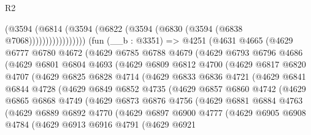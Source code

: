 \begin{lexlean}{R2}
\begin{coremodule}
                      (@3594 (@6814 (@3594 (@6822 (@3594 (@6830 (@3594 (@6838 @7068)))))))))))))))))
    (fun (__b : @3351) =>
    @4251
      (@4631
        @4665
        (@4629
          @6777
          @6780
          @4672
          (@4629
            @6785
            @6788
            @4679
            (@4629
              @6793
              @6796
              @4686
              (@4629
                @6801
                @6804
                @4693
                (@4629
                  @6809
                  @6812
                  @4700
                  (@4629
                    @6817
                    @6820
                    @4707
                    (@4629
                      @6825
                      @6828
                      @4714
                      (@4629
                        @6833
                        @6836
                        @4721
                        (@4629
                          @6841
                          @6844
                          @4728
                          (@4629
                            @6849
                            @6852
                            @4735
                            (@4629
                              @6857
                              @6860
                              @4742
                              (@4629
                                @6865
                                @6868
                                @4749
                                (@4629
                                  @6873
                                  @6876
                                  @4756
                                  (@4629
                                    @6881
                                    @6884
                                    @4763
                                    (@4629
                                      @6889
                                      @6892
                                      @4770
                                      (@4629
                                        @6897
                                        @6900
                                        @4777
                                        (@4629
                                          @6905
                                          @6908
                                          @4784
                                          (@4629
                                            @6913
                                            @6916
                                            @4791
                                            (@4629
                                              @6921

\end{coremodule}
\end{lexlean}
